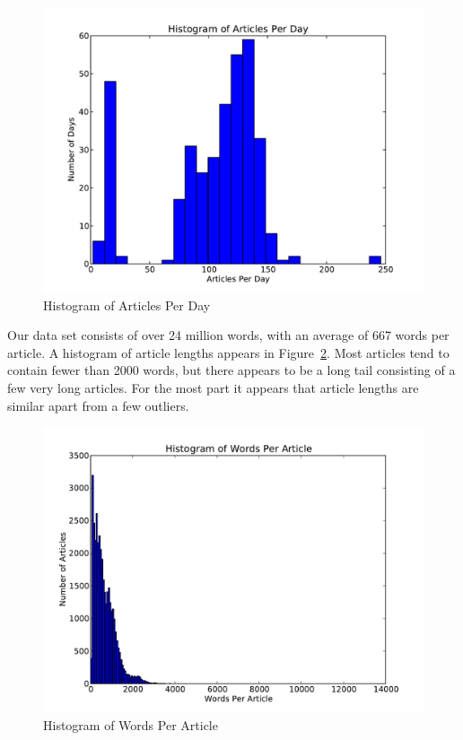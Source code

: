 \documentclass[10pt, twocolumn]{article}
\begin{document}
\begin{figure}
\centering
\includegraphics[scale=0.3]{text/articleshist.pdf}
\caption{Histogram of Articles Per Day}

\label{articlehist}
\end{figure}

Our data set consists of over 24 million words, with an average of 667 words per article. A histogram of article lengths appears in Figure~\ref{wordshist}. Most articles tend to contain fewer than 2000 words, but there appears to be a long tail consisting of a few very long articles. For the most part it appears that article lengths are similar apart from a few outliers.


\begin{figure}
\centering
\includegraphics[scale=0.3]{text/wordshist.pdf}
\caption{Histogram of Words Per Article}
\label{wordshist}
\end{figure}
\end{document}

